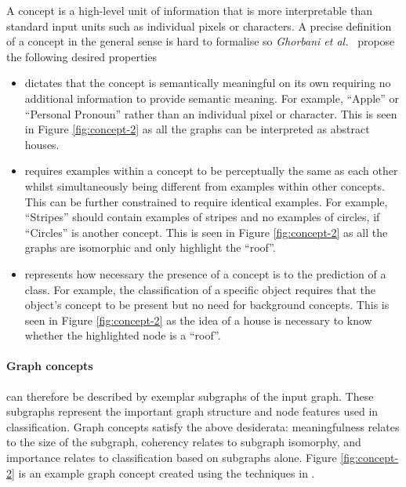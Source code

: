A concept is a high-level unit of information that is more interpretable than standard input units such as individual pixels or characters.
A precise definition of a concept in the general sense is hard to formalise so \textit{Ghorbani et al.}~\cite{ghorbani2019towards} propose the following desired properties
\begin{itemize}
    \item[]
        dictates that the concept is semantically meaningful on its own requiring no additional information to provide semantic meaning.
        For example, ``Apple'' or ``Personal Pronoun'' rather than an individual pixel or character.
        This is seen in Figure \ref{fig:concept-2} as all the graphs can be interpreted as abstract houses.
    \item[]
        requires examples within a concept to be perceptually the same as each other whilst simultaneously being different from examples within other concepts.
        This can be further constrained to require identical examples.
        For example, ``Stripes'' should contain examples of stripes and no examples of circles, if ``Circles'' is another concept.
        This is seen in Figure \ref{fig:concept-2} as all the graphs are isomorphic and only highlight the ``roof''.
    \item[]
        represents how necessary the presence of a concept is to the prediction of a class.
        For example, the classification of a specific object requires that the object's concept to be present but no need for background concepts.
        This is seen in Figure \ref{fig:concept-2} as the idea of a house is necessary to know whether the highlighted node is a ``roof''.
\end{itemize}



\paragraph{Graph concepts} can therefore be described by exemplar subgraphs of the input graph.
These subgraphs represent the important graph structure and node features used in classification.
Graph concepts satisfy the above desiderata: meaningfulness relates to the size of the subgraph, coherency relates to subgraph isomorphy, and importance relates to classification based on subgraphs alone.
Figure \ref{fig:concept-2} is an example graph concept created using the techniques in .

